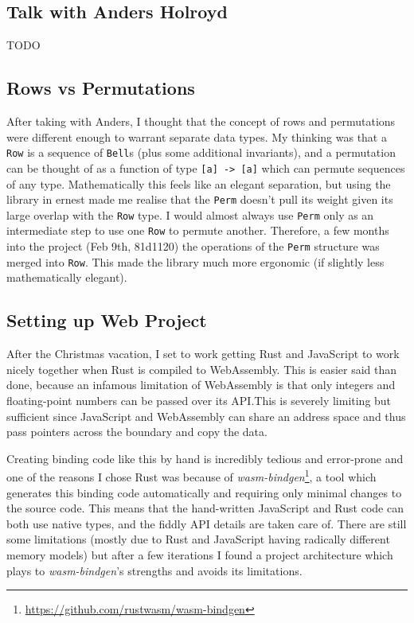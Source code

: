\documentclass[12pt]{article}
\newcommand{\footurl}[1]{\footnote{\url{#1}}}
\begin{document}
\subsection{Talk with Anders Holroyd}

TODO

\subsection{Rows vs Permutations}

After taking with Anders, I thought that the concept of rows and permutations were different enough
to warrant separate data types.  My thinking was that a \verb|Row| is a sequence of \verb|Bell|s
(plus some additional invariants), and a permutation can be thought of as a function of type
\verb|[a] -> [a]| which can permute sequences of any type.  Mathematically this feels like an
elegant separation, but using the library in ernest made me realise that the \verb|Perm| doesn't
pull its weight given its large overlap with the \verb|Row| type.  I would almost always use
\verb|Perm| only as an intermediate step to use one \verb|Row| to permute another.  Therefore, a few
months into the project (Feb 9th, 81d1120) the operations of the \verb|Perm| structure was merged
into \verb|Row|.  This made the library much more ergonomic (if slightly less mathematically
elegant).

\subsection{Setting up Web Project}

After the Christmas vacation, I set to work getting Rust and JavaScript to work nicely together when
Rust is compiled to WebAssembly.  This is easier said than done, because an infamous limitation of
WebAssembly is that only integers and floating-point numbers can be passed over its API.\@  This is
severely limiting but sufficient since JavaScript and WebAssembly can share an address space and
thus pass pointers across the boundary and copy the data.

Creating binding code like this by hand is incredibly tedious and error-prone and one of the reasons
I chose Rust was because of
\emph{wasm-bindgen}\footurl{https://github.com/rustwasm/wasm-bindgen}, a tool which generates
this binding code automatically and requiring only minimal changes to the source code.  This means
that the hand-written JavaScript and Rust code can both use native types, and the fiddly API details
are taken care of.  There are still some limitations (mostly due to Rust and JavaScript having
radically different memory models) but after a few iterations I found a project architecture which
plays to \emph{wasm-bindgen}'s strengths and avoids its limitations.
\end{document}
